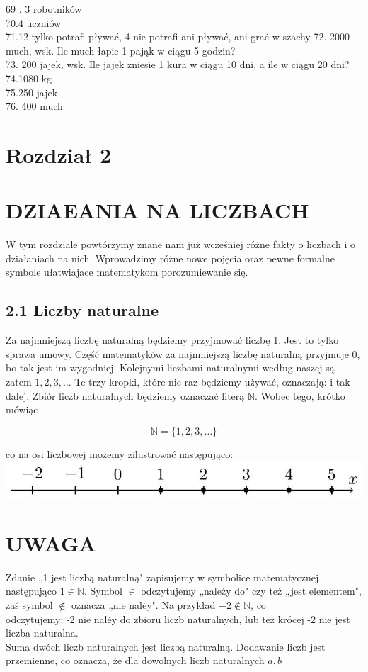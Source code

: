 \documentclass[10pt]{article}
\begin{document}
69 . 3 robotników\\
70.4 uczniów\\
71.12 tylko potrafi pływać, 4 nie potrafi ani pływać, ani grać w szachy 72. 2000 much, wsk. Ile much łapie 1 pająk w ciągu 5 godzin?\\
73. 200 jajek, wsk. Ile jajek zniesie 1 kura w ciągu 10 dni, a ile w ciągu 20 dni?\\
74.1080 kg\\
75.250 jajek\\
76. 400 much

\section*{Rozdział 2}
\section*{DZIAEANIA NA LICZBACH}
W tym rozdziale powtórzymy znane nam już wcześniej różne fakty o liczbach i o działaniach na nich. Wprowadzimy różne nowe pojęcia oraz pewne formalne symbole ułatwiajace matematykom porozumiewanie się.

\subsection*{2.1 Liczby naturalne}
Za najmniejszą liczbę naturalną będziemy przyjmować liczbę 1. Jest to tylko sprawa umowy. Część matematyków za najmniejszą liczbę naturalną przyjmuje 0, bo tak jest im wygodniej. Kolejnymi liczbami naturalnymi według naszej są zatem \(1,2,3, \ldots\) Te trzy kropki, które nie raz będziemy używać, oznaczają: i tak dalej. Zbiór liczb naturalnych będziemy oznaczać literą \(\mathbb{N}\). Wobec tego, krótko mówiąc

\[
\mathbb{N}=\{1,2,3, \ldots\}
\]

co na osi liczbowej możemy zilustrować następująco:\\
\includegraphics[max width=\textwidth, center]{2024_11_21_8f01584889ff06348ae7g-019}

\section*{UWAGA}
Zdanie „1 jest liczbą naturalną" zapisujemy w symbolice matematycznej następująco \(1 \in \mathbb{N}\). Symbol \(\in\) odczytujemy „należy do" czy też „jest elementem", zaś symbol \(\notin\) oznacza „nie nalė̇y". Na przykład \(-2 \notin \mathbb{N}\), co\\
odczytujemy: -2 nie nalė̇y do zbioru liczb naturalnych, lub też krócej -2 nie jest liczba naturalna.\\
Suma dwóch liczb naturalnych jest liczbą naturalną. Dodawanie liczb jest przemienne, co oznacza, że dla dowolnych liczb naturalnych \(a, b\)
\end{document}
